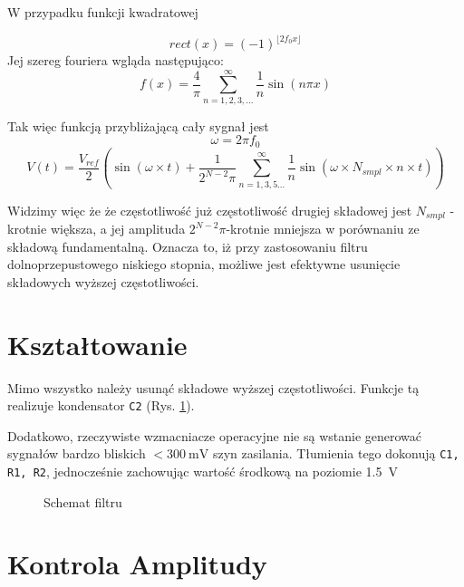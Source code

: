 \documentclass[12pt, a4paper]{article}
\begin{document}
\begin{lemma}
	W przypadku funkcji kwadratowej
	
	\begin{equation}
		rect(x) = (-1)^{\lfloor	2 f_0 x \rfloor}
	\end{equation}
	Jej szereg fouriera wgląda następująco:
	\begin{equation}
			f(x) = \frac{4}{\pi} \sum_{n=1,2,3,...}^{\infty} \frac{1}{n} \sin \left( n \pi x \right)
	\end{equation}
\end{lemma}

\begin{theorem}
Tak więc funkcją przybliżającą cały sygnał jest
	\begin{equation}
		\omega = 2 \pi f_0 
	\end{equation}
	\begin{equation}
		V(t) = \frac{V_{ref}}{2} \left( \sin \left( \omega \times t \right) + \frac{1}{ 2^{N - 2}\pi} \sum_{n=1,3,5...}^{\infty} \frac{1}{n} \sin \left( \omega \times N_{smpl} \times n \times t \right) \right)
	\end{equation}
\end{theorem}
\fi

Widzimy więc że że częstotliwość już częstotliwość drugiej składowej jest $N_{smpl}$ - krotnie większa, a jej amplituda $2^{N -2}\pi$-krotnie mniejsza w porównaniu ze składową fundamentalną.
Oznacza to, iż przy zastosowaniu filtru dolnoprzepustowego niskiego stopnia, możliwe jest efektywne usunięcie składowych wyższej częstotliwości.

\section{Kształtowanie}
Mimo wszystko należy usunąć składowe wyższej częstotliwości. Funkcje tą realizuje kondensator \verb|C2| (Rys. \ref{fig:filter}).

Dodatkowo, rzeczywiste wzmacniacze operacyjne nie są wstanie generować sygnałów bardzo bliskich $<\qty{300}{\mV}$ szyn zasilania.
Tłumienia tego dokonują \verb|C1, R1, R2|, jednocześnie zachowując wartość środkową na poziomie \qty{1,5}{\V}

\begin{figure}[h]
	\centering
	
	\caption{Schemat filtru}
	\label{fig:filter}
\end{figure}


\section{Kontrola Amplitudy}
\end{document}
